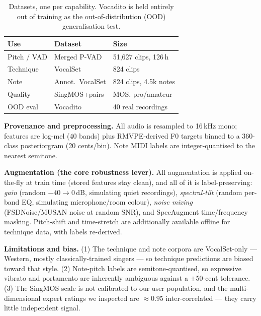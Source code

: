 \documentclass{article}
\begin{document}
\begin{table}[htbp]
\centering
\begin{tabularx}{\columnwidth}{@{}l l X@{}}
\toprule
\bfseries Use & \bfseries Dataset & \bfseries Size \\
\midrule
Pitch / VAD & Merged P-VAD     & 51{,}627 clips, 126\,h \\
Technique   & VocalSet         & 824 clips \\
Note        & Annot.\ VocalSet & 824 clips, 4.5k notes \\
Quality     & SingMOS+pairs    & MOS, pro/amateur \\
OOD eval    & Vocadito         & 40 real recordings \\
\bottomrule
\end{tabularx}
\caption{Datasets, one per capability. Vocadito is held entirely out of training as
the out-of-distribution (OOD) generalisation test.}
\label{tab:data}
\end{table}

\textbf{Provenance and preprocessing.} All audio is resampled to 16\,kHz mono; features
are log-mel (40 bands) plus RMVPE-derived F0 targets binned to a 360-class
posteriorgram (20 cents/bin). Note MIDI labels are integer-quantised to the nearest
semitone.

\textbf{Augmentation (the core robustness lever).} All augmentation is applied
on-the-fly at train time (stored features stay clean), and all of it is
label-preserving: \emph{gain} (random $-40 \to 0$\,dB, simulating quiet recordings),
\emph{spectral-tilt} (random per-band EQ, simulating microphone/room colour),
\emph{noise mixing} (FSDNoise/MUSAN noise at random SNR), and SpecAugment time/frequency
masking. Pitch-shift and time-stretch are additionally available offline for technique
data, with labels re-derived.

\textbf{Limitations and bias.} (1) The technique and note corpora are VocalSet-only ---
Western, mostly classically-trained singers --- so technique predictions are biased
toward that style. (2) Note-pitch labels are semitone-quantised, so expressive
vibrato and portamento are inherently ambiguous against a $\pm$50-cent tolerance.
(3) The SingMOS scale is not calibrated to our user population, and the
multi-dimensional expert ratings we inspected are $\approx 0.95$ inter-correlated ---
they carry little independent signal.

\end{document}
